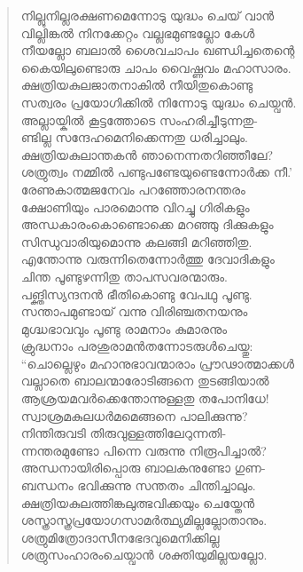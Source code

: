 \begin{verse}
നില്ലുനില്ലരക്ഷണമെന്നോടു യുദ്ധം ചെയ് വാന്‍\\
വില്ലിങ്കല്‍ നിനക്കേറ്റം വല്ലഭമുണ്ടല്ലോ കേള്‍\\
നീയല്ലോ ബലാല്‍ ശൈവചാപം ഖണ്ഡിച്ചതെന്റെ\\
കൈയിലുണ്ടൊരു ചാപം വൈഷ്ണവം മഹാസാരം.\\
ക്ഷത്രിയകുലജാതനാകില്‍ നീയിതുകൊണ്ടു\\
സത്വരം പ്രയോഗിക്കില്‍ നിന്നോടു യുദ്ധം ചെയ്വന്‍.\\
അല്ലായ്കില്‍ കൂട്ടത്തോടെ സംഹരിച്ചീടുന്നതു-\\
ണ്ടില്ല സന്ദേഹമെനിക്കെന്നതു ധരിച്ചാലും.\\
ക്ഷത്രിയകുലാന്തകന്‍ ഞാനെന്നതറിഞ്ഞീലേ?\\
ശത്രുത്വം നമ്മില്‍ പണ്ടുപണ്ടേയുണ്ടെന്നോര്‍ക്ക നീ.’\\
രേണുകാത്മജനേവം പറഞ്ഞോരനന്തരം\\
ക്ഷോണിയും പാരമൊന്നു വിറച്ചു ഗിരികളും\\
അന്ധകാരംകൊണ്ടൊക്കെ മറഞ്ഞു ദിക്കുകളും\\
സിന്ധുവാരിയുമൊന്നു കലങ്ങി മറിഞ്ഞിതു.\\
എന്തോന്നു വരുന്നിതെന്നോര്‍ത്തു ദേവാദികളും\\
ചിന്ത പൂണ്ടുഴന്നിതു താപസവരന്മാരും.\\
പങ്ക്തിസ്യന്ദനന്‍ ഭീതികൊണ്ടു വേപഥു പൂണ്ടു.\\
സന്താപമുണ്ടായ് വന്നു വിരിഞ്ചതനയനും\\
മുഗ്ദ്ധഭാവവും പൂണ്ടു രാമനാം കുമാരനും\\
ക്രുദ്ധനാം പരശുരാമന്‍തന്നോടരുള്‍ചെയ്തു:\\
“ചൊല്ലെഴും മഹാനുഭാവന്മാരാം പ്രൗഢാത്മാക്കള്‍\\
വല്ലാതെ ബാലന്മാരോടിങ്ങനെ തുടങ്ങിയാല്‍\\
ആശ്രയമവര്‍ക്കെന്തോന്നുള്ളതു തപോനിധേ!\\
സ്വാശ്രമകുലധര്‍മമെങ്ങനെ പാലിക്കുന്നു?\\
നിന്തിരുവടി തിരുവുള്ളത്തിലേറുന്നതി-\\
ന്നന്തരമുണ്ടോ പിന്നെ വരുന്നു നിരൂപിച്ചാല്‍?\\
അന്ധനായിരിപ്പൊരു ബാലകനുണ്ടോ ഗുണ-\\
ബന്ധനം ഭവിക്കുന്നു സന്തതം ചിന്തിച്ചാലും.\\
ക്ഷത്രിയകുലത്തിങ്കലുത്ഭവിക്കയും ചെയ്തേന്‍\\
ശസ്ത്രാസ്ത്രപ്രയോഗസാമര്‍ത്ഥ്യമില്ലല്ലോതാനും.\\
ശത്രുമിത്രോദാസീനഭേദവുമെനിക്കില്ല\\
ശത്രുസംഹാരംചെയ്വാന്‍ ശക്തിയുമില്ലയല്ലോ.\\

\end{verse}
